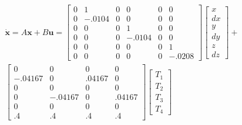 \documentclass[12pt]{extarticle}
\begin{document}
{%
\begin{equation}\begin{split}
 \dot{\pmb{x}}=A\pmb{x}+B\pmb{u}=\begin{bmatrix}0&1&0&0&0&0\\
    0&-.0104&0&0&0&0\\
    0&0&0&1&0&0\\
    0&0&0&-.0104&0&0\\
    0&0&0&0&0&1\\
    0&0&0&0&0&-.0208\end{bmatrix}\begin{bmatrix}x\\dx\\y\\dy\\z\\dz\end{bmatrix}
  +\\
  \begin{bmatrix}0&0&0&0\\
   -.04167&0&.04167&0\\
   0&0&0&0\\
   0&-.04167&0&.04167\\
   0&0&0&0\\
   .4&.4&.4&.4\end{bmatrix}\begin{bmatrix}T_1\\T_2\\T_3\\T_4\end{bmatrix}
\end{split}\label{model}\end{equation}


{
}


}
\end{document}
